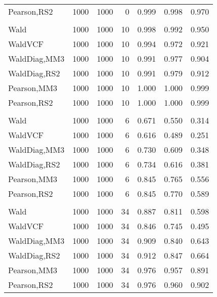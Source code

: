 \documentclass[
]{article}
\begin{document}
\begin{table}[H]
{\begin{tabular}[t]{lrrrrrr}
\hspace{1em}Pearson,RS2 & 1000 & 1000 & 0 & 0.999 & 0.998 & 0.970\\
\addlinespace[0.3em]
\multicolumn{7}{l}{\textbf{1F 15V}}\\
\hspace{1em}Wald & 1000 & 1000 & 10 & 0.998 & 0.992 & 0.950\\
\hspace{1em}WaldVCF & 1000 & 1000 & 10 & 0.994 & 0.972 & 0.921\\
\hspace{1em}WaldDiag,MM3 & 1000 & 1000 & 10 & 0.991 & 0.977 & 0.904\\
\hspace{1em}WaldDiag,RS2 & 1000 & 1000 & 10 & 0.991 & 0.979 & 0.912\\
\hspace{1em}Pearson,MM3 & 1000 & 1000 & 10 & 1.000 & 1.000 & 0.999\\
\hspace{1em}Pearson,RS2 & 1000 & 1000 & 10 & 1.000 & 1.000 & 0.999\\
\addlinespace[0.3em]
\multicolumn{7}{l}{\textbf{2F 10V}}\\
\hspace{1em}Wald & 1000 & 1000 & 6 & 0.671 & 0.550 & 0.314\\
\hspace{1em}WaldVCF & 1000 & 1000 & 6 & 0.616 & 0.489 & 0.251\\
\hspace{1em}WaldDiag,MM3 & 1000 & 1000 & 6 & 0.730 & 0.609 & 0.348\\
\hspace{1em}WaldDiag,RS2 & 1000 & 1000 & 6 & 0.734 & 0.616 & 0.381\\
\hspace{1em}Pearson,MM3 & 1000 & 1000 & 6 & 0.845 & 0.765 & 0.556\\
\hspace{1em}Pearson,RS2 & 1000 & 1000 & 6 & 0.845 & 0.770 & 0.589\\
\addlinespace[0.3em]
\multicolumn{7}{l}{\textbf{3F 15V}}\\
\hspace{1em}Wald & 1000 & 1000 & 34 & 0.887 & 0.811 & 0.598\\
\hspace{1em}WaldVCF & 1000 & 1000 & 34 & 0.846 & 0.745 & 0.495\\
\hspace{1em}WaldDiag,MM3 & 1000 & 1000 & 34 & 0.909 & 0.840 & 0.643\\
\hspace{1em}WaldDiag,RS2 & 1000 & 1000 & 34 & 0.912 & 0.847 & 0.664\\
\hspace{1em}Pearson,MM3 & 1000 & 1000 & 34 & 0.976 & 0.957 & 0.891\\
\hspace{1em}Pearson,RS2 & 1000 & 1000 & 34 & 0.976 & 0.960 & 0.902\\
\bottomrule
\end{tabular}}
\endgroup{}
\end{table}
\end{document}
